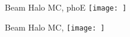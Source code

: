 \documentclass{beamer}
\begin{document}
\begin{frame}{Beam Halo MC, phoE}
    \texttt{[image: ]}
\end{frame}
\begin{frame}{Beam Halo MC, }
    \texttt{[image: ]}
\end{frame}
\end{document}
